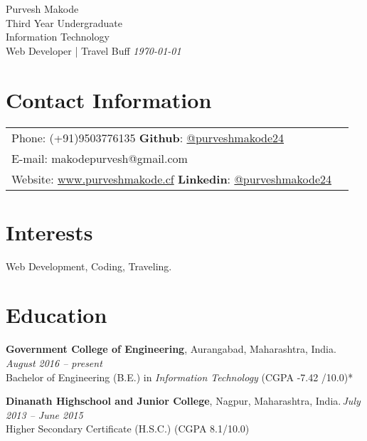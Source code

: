 \documentclass[margin,line]{res}
\begin{document}
{\Huge \ttfamily Purvesh Makode} \\
{\small Third Year Undergraduate}\\
{\small Information Technology}\\
{\small Web Developer | Travel Buff} \hspace{11cm} {\em \today}
\vspace{0.03in}
\begin{resume}
\section{\sc Contact Information}



\vspace{.08in}

\begin{tabular} {@{}p{10in}p{1in}}  
             {Phone:}  (+91)9503776135  \hspace{6cm} {\bf Github}: \href{https://github.com/PurveshMakode24}{@purveshmakode24}\\ 
		{E-mail:}  makodepurvesh@gmail.com\\
		 {Website:} \url{www.purveshmakode.cf} \hspace{4.73cm} {\bf Linkedin}: \href{https://www.linkedin.com/in/purveshmakode24/}{@purveshmakode24}
\end{tabular}


\section{\sc Interests}

Web Development, Coding, Traveling.
\vspace{0.3cm}

\section{\sc Education}
{\bf Government College of Engineering}, Aurangabad, Maharashtra, India.\, \hfill  {\em August 2016 -- present} \\
Bachelor of Engineering (B.E.) in {\em Information Technology } \hfill(CGPA -7.42 /10.0)*

{\bf Dinanath Highschool and Junior College}, Nagpur, Maharashtra, India.\,\hfill {\em July 2013 -- June 2015}\\
Higher Secondary Certificate (H.S.C.) \hfill(CGPA 8.1/10.0)
 \vspace{0.4cm}
\iffalse

\end{resume}
\end{document}
